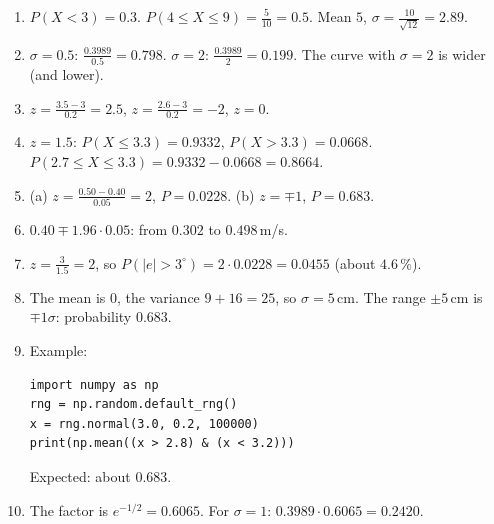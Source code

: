 \begin{enumerate}[label=\textbf{\ansnum.\arabic*}]
  \item $P(X<3)=0.3$. $P(4\le X\le9)=\frac5{10}=0.5$. Mean $5$, $\sigma=\frac{10}{\sqrt{12}}=2.89$.
  \item $\sigma=0.5$: $\frac{0.3989}{0.5}=0.798$. $\sigma=2$: $\frac{0.3989}{2}=0.199$. The curve with $\sigma=2$ is wider (and lower).
  \item $z=\frac{3.5-3}{0.2}=2.5$, $z=\frac{2.6-3}{0.2}=-2$, $z=0$.
  \item $z=1.5$: $P(X\le3.3)=0.9332$, $P(X>3.3)=0.0668$. $P(2.7\le X\le3.3)=0.9332-0.0668=0.8664$.
  \item (a) $z=\frac{0.50-0.40}{0.05}=2$, $P=0.0228$. (b) $z=\mp1$, $P=0.683$.
  \item $0.40\mp1.96\cdot0.05$: from $0.302$ to $0.498$\,m/s.
  \item $z=\frac{3}{1.5}=2$, so $P(|e|>3^\circ)=2\cdot0.0228=0.0455$ (about $4.6\,\%$).
  \item The mean is $0$, the variance $9+16=25$, so $\sigma=5$\,cm. The range $\pm5$\,cm is $\mp1\sigma$: probability $0.683$.
  \item Example:
\begin{verbatim}
import numpy as np
rng = np.random.default_rng()
x = rng.normal(3.0, 0.2, 100000)
print(np.mean((x > 2.8) & (x < 3.2)))
\end{verbatim}
  Expected: about $0.683$.
  \item[\textbf{\ansnum.10}] The factor is $e^{-1/2}=0.6065$. For $\sigma=1$: $0.3989\cdot0.6065=0.2420$.
\end{enumerate}
